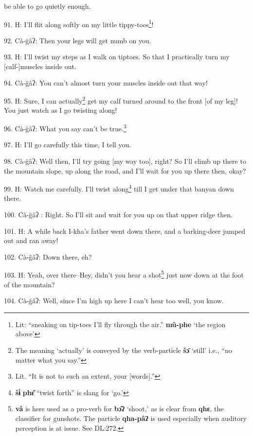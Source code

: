 be able to go quietly enough.

91. H: I'll flit along softly on my little tippy-toes\footnote{Lit: ``sneaking on tip-toes I'll fly through the air.'' \textbf{mû-phe} `the region above'}!

\begin{center}
\end{center}

92. Cà-g̈âʔ: Then your legs will get numb on you.

93. H: I'll twist my steps as I walk on tiptoes. So that I practically turn my [calf-]muscles
inside out.

94. Cà-g̈âʔ: You can't almost turn your muscles inside out that way!

95. H: Sure, I can actually\footnote{The meaning `actually' is conveyed by the verb-particle \textbf{šɔ̄} `still' i.e., ``no matter what you say.''} get my calf turned around to the front [of my leg]!
You just watch as I go twisting along!

\begin{center}
\end{center}

96. Cà-g̈âʔ: What you say can't be true.\footnote{Lit. ``It is not to such an extent, your [words].''}

97. H: I'll go carefully this time, I tell you.

98. Cà-g̈âʔ: Well then, I'll try going [my way too], right? So I'll climb up
there to the mountain slope, up along the road, and I'll wait for you up there
then, okay?

99. H: Watch me carefully. I'll twist along\footnote{\textbf{šɨ́} \textbf{phɛ̂} ``twist forth'' is slang for `go.'} till I get under that banyan down
there.

100. Cà-g̈âʔ : Right. So I'll sit and wait for you up on that upper ridge then.

101. H: A while back I-kha's father went down there, and a barking-deer jumped out
and ran away!

102. Cà-g̈âʔ: Down there, eh?

103. H: Yeah, over there--Hey, didn't you hear a shot\footnote{\textbf{vâ} is here used as a pro-verb for \textbf{bɔ̂ʔ} `shoot,' as is clear from \textbf{qhɛ}, the classifier for gunshots. The particle \textbf{qha-pâʔ} is used especially when auditory perception is at issue. See DL:272.} just now down at the
foot of the mountain?

104. Cà-g̈âʔ: Well, since I'm high up here I can't hear too well, you know.

